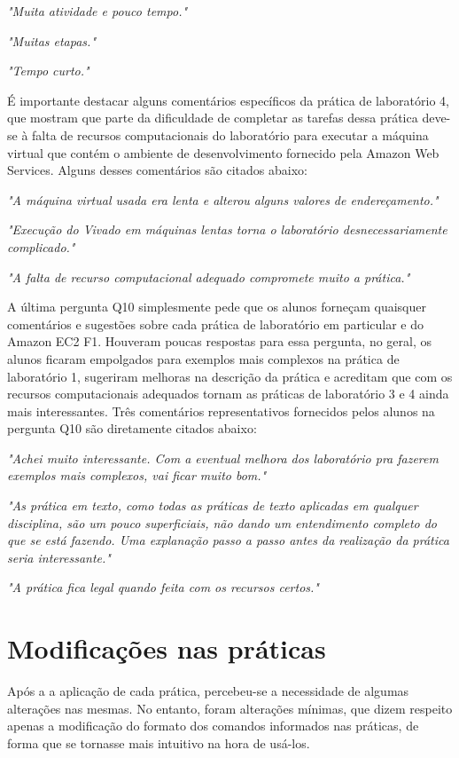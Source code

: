 \textit{"Muita atividade e pouco tempo."}

\textit{"Muitas etapas."}

\textit{"Tempo curto."}

É importante destacar alguns comentários específicos da prática de laboratório 4, que mostram que parte da dificuldade de completar as tarefas dessa prática deve-se à falta de recursos computacionais do laboratório para executar a máquina virtual que contém o ambiente de desenvolvimento fornecido pela Amazon Web Services. Alguns desses comentários são citados abaixo:

\textit{"A máquina virtual usada era lenta e alterou alguns valores de endereçamento."}

\textit{"Execução do Vivado em máquinas lentas torna o laboratório desnecessariamente complicado."}

\textit{"A falta de recurso computacional adequado compromete muito a prática."}


A última pergunta Q10 simplesmente pede que os alunos forneçam quaisquer comentários e sugestões sobre cada prática de laboratório em particular e do Amazon EC2 F1. Houveram poucas respostas para essa pergunta, no geral, os alunos ficaram empolgados para exemplos mais complexos na prática de laboratório 1, sugeriram melhoras na descrição da prática e acreditam que com os recursos computacionais adequados tornam as práticas de laboratório 3 e 4 ainda mais interessantes. Três comentários representativos fornecidos pelos alunos na pergunta Q10 são diretamente citados abaixo: 

\textit{"Achei muito interessante. Com a eventual melhora dos laboratório pra fazerem exemplos mais complexos, vai ficar muito bom."}

\textit{"As prática em texto, como todas as práticas de texto aplicadas em qualquer disciplina, são um pouco superficiais, não dando um entendimento completo do que se está fazendo. Uma explanação passo a passo antes da realização da prática seria interessante."}

\textit{"A prática fica legal quando feita com os recursos certos."}

\section{Modificações nas práticas}\label{sec:modificacoes-nas-praticas}

Após a a aplicação de cada prática, percebeu-se a necessidade de algumas alterações nas mesmas. No entanto, foram alterações mínimas, que dizem respeito apenas a modificação do formato dos comandos informados nas práticas, de forma que se tornasse mais intuitivo na hora de usá-los.

